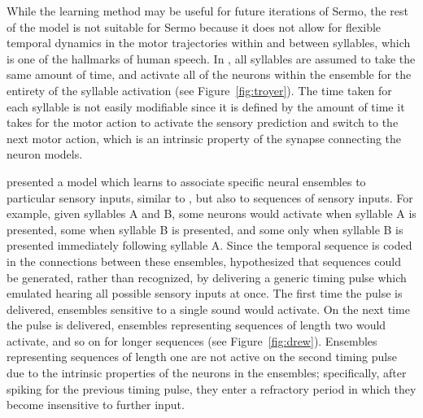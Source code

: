 
While the learning method
may be useful for future iterations of Sermo,
the rest of the model is not suitable for Sermo
because it does not allow for
flexible temporal dynamics
in the motor trajectories within and between syllables,
which is one of the hallmarks of human speech.
In \citet{troyer2000},
all syllables are assumed
to take the same amount of time,
and activate all of the neurons
within the ensemble for the entirety
of the syllable activation
(see Figure~\ref{fig:troyer}).
The time taken for each syllable
is not easily modifiable since
it is defined by the amount of time
it takes for the motor action
to activate the sensory prediction
and switch to the next motor action,
which is an intrinsic property
of the synapse connecting the neuron models.

\citet{drew2003} presented a model
which learns to associate specific neural ensembles
to particular sensory inputs,
similar to \citet{troyer2000},
but also to sequences of sensory inputs.
For example, given syllables A and B,
some neurons would activate
when syllable A is presented,
some when syllable B is presented,
and some only when syllable B is presented
immediately following syllable A.
Since the temporal sequence is
coded in the connections between
these ensembles,
\citeauthor{drew2003} hypothesized that
sequences could be generated,
rather than recognized,
by delivering a generic timing pulse
which emulated hearing all possible sensory
inputs at once.
The first time the pulse is delivered,
ensembles sensitive to a single sound
would activate.
On the next time the pulse is delivered,
ensembles representing sequences of length two
would activate, and so on for longer sequences
(see Figure~\ref{fig:drew}).
Ensembles representing sequences of length one
are not active on the second timing pulse
due to the intrinsic properties
of the neurons in the ensembles;
specifically, after spiking
for the previous timing pulse,
they enter a refractory period
in which they become insensitive to further input.

